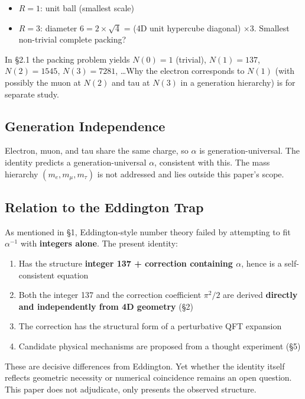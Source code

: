 \documentclass[a4paper,11pt]{article}
\begin{document}
\begin{itemize}
\item $R = 1$: unit ball (smallest scale)
\item $R = 3$: diameter $6 = 2 \times \sqrt{4}$ = (4D unit hypercube diagonal) $\times 3$. Smallest non-trivial complete packing?
\end{itemize}

In §2.1 the packing problem yields $N(0) = 1$ (trivial), $N(1) = 137$, $N(2) = 1545$, $N(3) = 7281$, \ldots Why the electron corresponds to $N(1)$ (with possibly the muon at $N(2)$ and tau at $N(3)$ in a generation hierarchy) is for separate study.

\subsection{Generation Independence}

Electron, muon, and tau share the same charge, so $\alpha$ is generation-universal. The identity predicts a generation-universal $\alpha$, consistent with this. The mass hierarchy $(m_e, m_\mu, m_\tau)$ is not addressed and lies outside this paper's scope.

\subsection{Relation to the Eddington Trap}

As mentioned in §1, Eddington-style number theory failed by attempting to fit $\alpha^{-1}$ with \textbf{integers alone}. The present identity:

\begin{enumerate}
\item Has the structure \textbf{integer 137 + correction containing $\alpha$}, hence is a self-consistent equation
\item Both the integer 137 and the correction coefficient $\pi^2/2$ are derived \textbf{directly and independently from 4D geometry} (§2)
\item The correction has the structural form of a perturbative QFT expansion
\item Candidate physical mechanisms are proposed from a thought experiment (§5)
\end{enumerate}

These are decisive differences from Eddington. Yet whether the identity itself reflects geometric necessity or numerical coincidence remains an open question. This paper does not adjudicate, only presents the observed structure.
\end{document}
